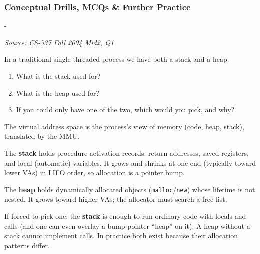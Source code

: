 \documentclass[11pt,a4paper]{article}
\makeatletter
\newcommand{\keepspace}[1]{\par\penalty-100\begingroup
  \setlength{\dimen@}{#1}\dimen@ii\pagegoal\advance\dimen@ii-\pagetotal
  \ifdim\dimen@>\dimen@ii\ifdim\dimen@ii>\z@\vfil\fi\break\fi\endgroup}
\newcounter{qn}[section]
\newenvironment{Qn}[4]{%
  \refstepcounter{qn}\keepspace{7\baselineskip}%
  \begin{tcolorbox}[qboxstyle, title={Q\thesection.\theqn\ \ [#1 \textbar\ #2]\ \ #4}]%
  {\footnotesize\color{g3}\textit{Source: #3}}\par\smallskip%
}{%
  \end{tcolorbox}%
}
\newenvironment{Sol}{%
  \begin{tcolorbox}[sboxstyle, title={Solution}]%
}{%
  \end{tcolorbox}\vspace{0.35em}%
}
\makeatother
\begin{document}
\subsubsection*{Conceptual Drills, MCQs \& Further Practice}

\begin{Qn}{Easy-Medium}{Lect 8}{CS-537 Fall 2004 Mid2, Q1}{Stack versus heap in a single-threaded process}
In a traditional single-threaded process we have both a stack and a heap.
\begin{enumerate}
  \item What is the stack used for?
  \item What is the heap used for?
  \item If you could only have one of the two, which would you pick, and
        why?
\end{enumerate}
\end{Qn}
\begin{Sol}
The virtual address space is the process's view of memory (code, heap,
stack), translated by the MMU.

The \textbf{stack} holds procedure activation records: return
addresses, saved registers, and local (automatic) variables. It grows
and shrinks at one end (typically toward lower VAs) in LIFO order, so
allocation is a pointer bump.

The \textbf{heap} holds dynamically allocated objects
(\texttt{malloc}/\texttt{new}) whose lifetime is not nested. It grows
toward higher VAs; the allocator must search a free list.

If forced to pick one: the \textbf{stack} is enough to run ordinary
code with locals and calls (and one can even overlay a bump-pointer
``heap'' on it). A heap without a stack cannot implement calls. In
practice both exist because their allocation patterns differ.
\end{Sol}
\end{document}
